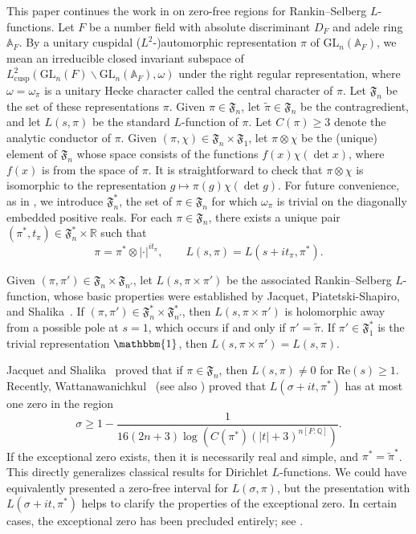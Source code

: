 \documentclass[12pt]{amsart}
\theoremstyle{definition}
\theoremstyle{remark}
\numberwithin{equation}{section}
\theoremstyle{plain}
\renewcommand{\tilde}{\widetilde}
\renewcommand{\Re}{\mathrm{Re}}
\newcommand{\re}{\Re}
\newcommand{\GL}{\mathrm{GL}}
\newcommand{\A}{\mathbb{A}}
\newcommand{\Q}{\mathbb{Q}}
\newcommand{\R}{\mathbb{R}}
\begin{document}
This paper continues the work in \cite{HarcosThorner} on zero-free regions for Rankin--Selberg $L$-functions.  Let $F$ be a number field with absolute discriminant $D_F$ and adele ring $\A_F$. By a unitary cuspidal ($L^2$-)automorphic representation $\pi$ of $\GL_n(\A_F)$, we mean an irreducible closed invariant subspace of $L^2_\mathrm{cusp}(\GL_n(F)\backslash\GL_n(\A_F),\omega)$ under the right regular representation, where $\omega=\omega_\pi$ is a unitary Hecke character called the central character of $\pi$. Let $\mathfrak{F}_n$ be the set of these representations $\pi$.  Given $\pi\in\mathfrak{F}_n$, let $\tilde{\pi}\in\mathfrak{F}_n$ be the contragredient, and let $L(s,\pi)$ be the standard $L$-function of $\pi$.  Let $C(\pi)\geq 3$ denote the analytic conductor of $\pi$.  Given $(\pi,\chi)\in\mathfrak{F}_n\times\mathfrak{F}_1$, let $\pi\otimes\chi$ be the (unique) element of $\mathfrak{F}_n$ whose space consists of the functions $f(x)\chi(\det x)$, where $f(x)$ is from the space of $\pi$. It is straightforward to check that $\pi\otimes\chi$ is isomorphic to the representation $g\mapsto\pi(g)\chi(\det g)$. For future convenience, as in \cite{HarcosThorner}, we introduce $\mathfrak{F}_n^*$, the set of $\pi\in\mathfrak{F}_n$ for which $\omega_{\pi}$ is trivial on the diagonally embedded positive reals.  For each $\pi\in\mathfrak{F}_n$, there exists a unique pair $(\pi^*,t_{\pi})\in\mathfrak{F}_n^*\times\R$ such that
\[
\pi=\pi^*\otimes|\cdot|^{it_{\pi}},\qquad L(s,\pi) = L(s+it_{\pi},\pi^*).
\]

Given $(\pi,\pi')\in\mathfrak{F}_n\times\mathfrak{F}_{n'}$, let $L(s,\pi\times\pi')$ be the associated Rankin--Selberg $L$-function, whose basic properties were established by Jacquet, Piatetski-Shapiro, and Shalika~\cite{JPSS,JS1,JS2}.  If $(\pi,\pi')\in\mathfrak{F}_n^*\times\mathfrak{F}_{n'}^*$, then $L(s,\pi\times\pi')$ is holomorphic away from a possible pole at $s=1$, which occurs if and only if $\pi'=\tilde{\pi}$.  If $\pi'\in\mathfrak{F}_1^*$ is the trivial representation $\mathbbm{1}$, then $L(s,\pi\times\pi')=L(s,\pi)$.

Jacquet and Shalika~\cite{JacquetShalika} proved that if $\pi\in\mathfrak{F}_n$, then $L(s,\pi)\neq 0$ for $\re(s)\geq 1$.  Recently, Wattanawanichkul~\cite[Theorem~1.1]{Wattanawanichkul} (see also \cite[Appendix]{Humphries}) proved that $L(\sigma+it,\pi^*)$ has at most one zero in the region
\begin{equation}
\label{eqn:standard_ZFR_log_1}
\sigma\geq 1-\frac{1}{16(2n+3)\log(C(\pi^*)(|t|+3)^{n[F:\Q]})}.
\end{equation}
If the exceptional zero exists, then it is necessarily real and simple, and $\pi^*=\tilde{\pi}^*$. This directly generalizes classical results for Dirichlet $L$-functions.  We could have equivalently presented a zero-free interval for $L(\sigma,\pi)$, but the presentation with $L(\sigma+it,\pi^*)$ helps to clarify the properties of the exceptional zero.  In certain cases, the exceptional zero has been precluded entirely; see \cite{Banks,HoffsteinLockhart,HoffsteinRamakrishnan,Thorner_Siegel1}.
\end{document}
